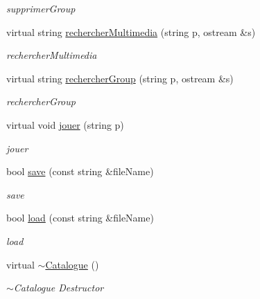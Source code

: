 \begin{DoxyCompactItemize}
\begin{DoxyCompactList}\small\item\em supprimer\-Group \end{DoxyCompactList}\item 
virtual string \hyperlink{classCatalogue_a07fb093b33ce5fc95af3ea8874aeef97}{rechercher\-Multimedia} (string p, ostream \&s)
\begin{DoxyCompactList}\small\item\em rechercher\-Multimedia \end{DoxyCompactList}\item 
virtual string \hyperlink{classCatalogue_ae033231c07cc7f5fd751a4c8d25ab8e5}{rechercher\-Group} (string p, ostream \&s)
\begin{DoxyCompactList}\small\item\em rechercher\-Group \end{DoxyCompactList}\item 
virtual void \hyperlink{classCatalogue_acb117d10f869d108f142cf38811f7022}{jouer} (string p)
\begin{DoxyCompactList}\small\item\em jouer \end{DoxyCompactList}\item 
bool \hyperlink{classCatalogue_a47134c107bbda909706188dc759bc076}{save} (const string \&file\-Name)
\begin{DoxyCompactList}\small\item\em save \end{DoxyCompactList}\item 
bool \hyperlink{classCatalogue_a9bba7adb9d7455f04b9cfc839c8ebd93}{load} (const string \&file\-Name)
\begin{DoxyCompactList}\small\item\em load \end{DoxyCompactList}\item 
virtual \hyperlink{classCatalogue_a023fd8d70a58f76d2bbd6ef1e3ef0e9e}{$\sim$\-Catalogue} ()
\begin{DoxyCompactList}\small\item\em $\sim$\-Catalogue Destructor \end{DoxyCompactList}\end{DoxyCompactItemize}


